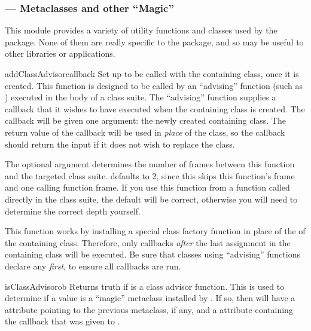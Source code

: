 \begin{verbatim%
}
\begin{verbatim%
}
\begin{verbatim%
}
\begin{verbatim%
}
\begin{verbatim%
}
\begin{verbatim%
}
\subsubsection{ --- Metaclasses and other ``Magic''}

This module provides a variety of utility functions and classes used by the
 package.  None of them are really specific to the
 package, and so may be useful to other libraries or
applications.

\begin{funcdesc}{addClassAdvisor}{callback }
Set up  to be called with the containing class, once it is
created.  This function is designed to be called by an ``advising'' function
(such as ) executed in the body of a class suite.
The ``advising'' function supplies a callback that it wishes to have executed
when the containing class is created.  The callback will be given one argument:
the newly created containing class.  The return value of the callback will be
used in \emph{place} of the class, so the callback should return the input if
it does not wish to replace the class.

The optional  argument determines the number of frames between this
function and the targeted class suite.   defaults to 2, since this
skips this function's frame and one calling function frame.  If you use this
function from a function called directly in the class suite, the default will
be correct, otherwise you will need to determine the correct depth yourself.

This function works by installing a special class factory function in
place of the  of the containing class.  Therefore, only
callbacks \emph{after} the last  assignment in the
containing class will be executed.  Be sure that classes using ``advising''
functions declare any  \emph{first}, to ensure all
callbacks are run.
\end{funcdesc}

\begin{funcdesc}{isClassAdvisor}{ob}
Returns truth if  is a class advisor function.  This is used to
determine if a  value is a ``magic'' metaclass installed
by .  If so, then  will have a
 attribute pointing to the previous metaclass,
if any, and a  attribute containing the callback that was
given to .
\end{funcdesc}


\end{verbatim%
}
\end{verbatim%
}
\end{verbatim%
}
\end{verbatim%
}
\end{verbatim%
}
\end{verbatim%
}
